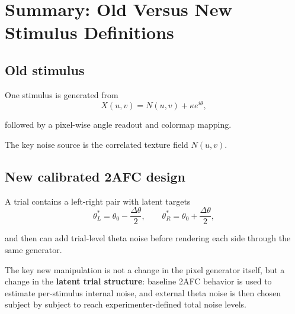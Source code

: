 \documentclass[11pt]{article}
\begin{document}
\section{Summary: Old Versus New Stimulus Definitions}

\subsection*{Old stimulus}

One stimulus is generated from
\[
X(u,v) = N(u,v) + \kappa e^{i\theta},
\]

followed by a pixel-wise angle readout and colormap mapping.

The key noise source is the correlated texture field $N(u,v)$.

\subsection*{New calibrated 2AFC design}

A trial contains a left-right pair with latent targets
\[
\theta_L^{\ast} = \theta_0 - \frac{\Delta\theta}{2},
\qquad
\theta_R^{\ast} = \theta_0 + \frac{\Delta\theta}{2},
\]

and then can add trial-level theta noise before rendering each side through
the same generator.

The key new manipulation is not a change in the pixel generator itself, but a
change in the \textbf{latent trial structure}: baseline 2AFC behavior is used
to estimate per-stimulus internal noise, and external theta noise is then
chosen subject by subject to reach experimenter-defined total noise levels.
\end{document}
